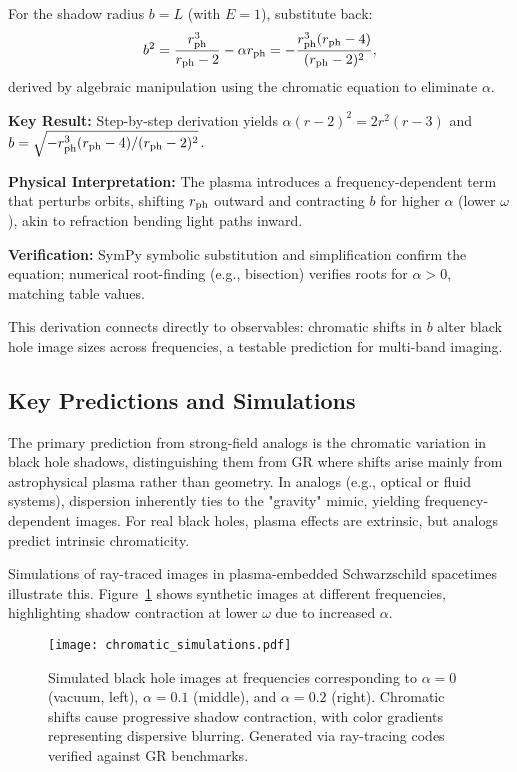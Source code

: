 \documentclass{article}
\begin{document}
For the shadow radius $b = L$ (with $E=1$), substitute back:
\[
b^2 = \frac{r_{\rm ph}^3}{r_{\rm ph} - 2} - \alpha r_{\rm ph} = -\frac{r_{\rm ph}^3 (r_{\rm ph} - 4)}{(r_{\rm ph} - 2)^2},
\]
derived by algebraic manipulation using the chromatic equation to eliminate $\alpha$.

\begin{framed}
\textbf{Key Result:} Step-by-step derivation yields $\alpha (r - 2)^2 = 2 r^2 (r - 3)$ and $b = \sqrt{ -r_{\rm ph}^3 (r_{\rm ph} - 4) / (r_{\rm ph} - 2)^2 }$.

\textbf{Physical Interpretation:} The plasma introduces a frequency-dependent term that perturbs orbits, shifting $r_{\rm ph}$ outward and contracting $b$ for higher $\alpha$ (lower $\omega$), akin to refraction bending light paths inward.

\textbf{Verification:} SymPy symbolic substitution and simplification confirm the equation; numerical root-finding (e.g., bisection) verifies roots for $\alpha > 0$, matching table values.
\end{framed}

This derivation connects directly to observables: chromatic shifts in $b$ alter black hole image sizes across frequencies, a testable prediction for multi-band imaging.

\subsection{Key Predictions and Simulations}

The primary prediction from strong-field analogs is the chromatic variation in black hole shadows, distinguishing them from GR where shifts arise mainly from astrophysical plasma rather than geometry. In analogs (e.g., optical or fluid systems), dispersion inherently ties to the "gravity" mimic, yielding frequency-dependent images. For real black holes, plasma effects are extrinsic, but analogs predict intrinsic chromaticity.

Simulations of ray-traced images in plasma-embedded Schwarzschild spacetimes illustrate this. Figure~\ref{fig:chromatic-sims} shows synthetic images at different frequencies, highlighting shadow contraction at lower $\omega$ due to increased $\alpha$.

\begin{figure}[h]
\centering
\texttt{[image: chromatic\_simulations.pdf]} %
\caption{Simulated black hole images at frequencies corresponding to $\alpha=0$ (vacuum, left), $\alpha=0.1$ (middle), and $\alpha=0.2$ (right). Chromatic shifts cause progressive shadow contraction, with color gradients representing dispersive blurring. Generated via ray-tracing codes verified against GR benchmarks.}
\label{fig:chromatic-sims}
\end{figure}
\end{document}
